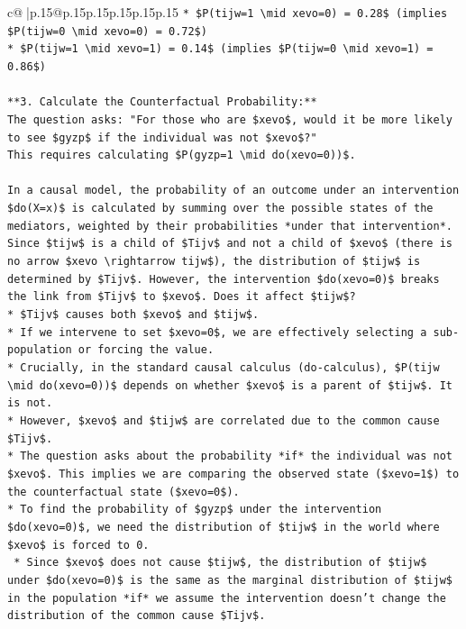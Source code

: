 \documentclass{article}
\begin{document}
{\begin{supertabular}{c@{$\;$}|p{.15\linewidth}@{}p{.15\linewidth}p{.15\linewidth}p{.15\linewidth}p{.15\linewidth}p{.15\linewidth}}
{{{\texttt{*   \$P(tijw=1 \textbackslash{}mid xevo=0) = 0.28\$ (implies \$P(tijw=0 \textbackslash{}mid xevo=0) = 0.72\$)} \\
\texttt{*   \$P(tijw=1 \textbackslash{}mid xevo=1) = 0.14\$ (implies \$P(tijw=0 \textbackslash{}mid xevo=1) = 0.86\$)} \\
\\ 
\texttt{**3. Calculate the Counterfactual Probability:**} \\
\texttt{The question asks: "For those who are \$xevo\$, would it be more likely to see \$gyzp\$ if the individual was not \$xevo\$?"} \\
\texttt{This requires calculating \$P(gyzp=1 \textbackslash{}mid do(xevo=0))\$.} \\
\\ 
\texttt{In a causal model, the probability of an outcome under an intervention \$do(X=x)\$ is calculated by summing over the possible states of the mediators, weighted by their probabilities *under that intervention*.} \\
\texttt{Since \$tijw\$ is a child of \$Tijv\$ and not a child of \$xevo\$ (there is no arrow \$xevo \textbackslash{}rightarrow tijw\$), the distribution of \$tijw\$ is determined by \$Tijv\$. However, the intervention \$do(xevo=0)\$ breaks the link from \$Tijv\$ to \$xevo\$. Does it affect \$tijw\$?} \\
\texttt{*   \$Tijv\$ causes both \$xevo\$ and \$tijw\$.} \\
\texttt{*   If we intervene to set \$xevo=0\$, we are effectively selecting a sub{-}population or forcing the value.} \\
\texttt{*   Crucially, in the standard causal calculus (do{-}calculus), \$P(tijw \textbackslash{}mid do(xevo=0))\$ depends on whether \$xevo\$ is a parent of \$tijw\$. It is not.} \\
\texttt{*   However, \$xevo\$ and \$tijw\$ are correlated due to the common cause \$Tijv\$.} \\
\texttt{*   The question asks about the probability *if* the individual was not \$xevo\$. This implies we are comparing the observed state (\$xevo=1\$) to the counterfactual state (\$xevo=0\$).} \\
\texttt{*   To find the probability of \$gyzp\$ under the intervention \$do(xevo=0)\$, we need the distribution of \$tijw\$ in the world where \$xevo\$ is forced to 0.} \\
\texttt{    *   Since \$xevo\$ does not cause \$tijw\$, the distribution of \$tijw\$ under \$do(xevo=0)\$ is the same as the marginal distribution of \$tijw\$ in the population *if* we assume the intervention doesn't change the distribution of the common cause \$Tijv\$.} \\
}}}
\end{supertabular}}
\end{document}
